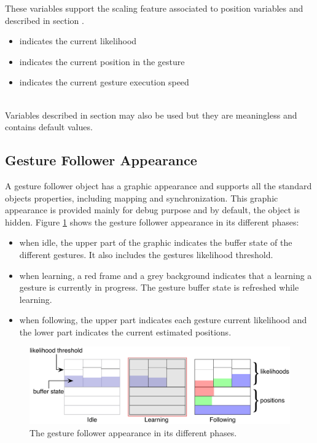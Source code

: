 \documentclass[a4paper,twoside]{report}
\newcommand{\subsublevel}[1]	{\subsection{#1}}
\begin{document}
These variables support the scaling feature associated to position variables and described in section .
\begin{itemize}
\item {} indicates the current likelihood 
\item {} indicates the current position in the gesture 
\item {} indicates the current gesture execution speed 
\end{itemize}

\note{}\\
Variables described in section  may also be used but they are meaningless and contains default values.


\subsublevel{Gesture Follower Appearance}
\label{gfgraphs}

A gesture follower object has a graphic appearance and supports all the standard objects properties, including mapping and synchronization. This graphic appearance is provided mainly for debug purpose and by default, the object is hidden. Figure  \ref{fig:gfgraph} shows the gesture follower appearance in its different phases:
\begin{itemize}
\item when idle, the upper part of the graphic indicates the buffer state of the different gestures. It also includes the gestures likelihood threshold.
\item when learning, a red frame and a grey background indicates that a learning a gesture is currently in progress. The gesture buffer state is refreshed while learning.
\item when following, the upper part indicates each gesture current likelihood and the lower part indicates the current estimated positions.
\end{itemize}


\begin{figure}[h]
	\centering \includegraphics[width=0.85\columnwidth]{imgs/gesture-follower}
 \caption{The gesture follower appearance in its different phases.}
 \label{fig:gfgraph}
\end{figure}
\end{document}
